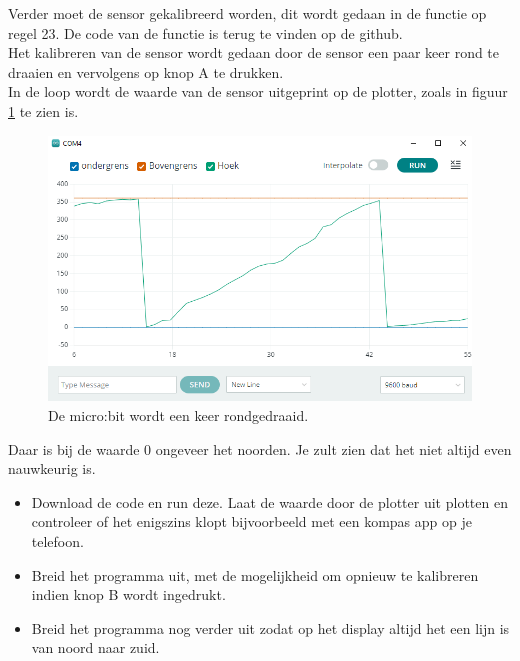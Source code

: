 \begin{enumerate}
Verder moet de sensor gekalibreerd worden, dit wordt gedaan in de functie op regel 23. De code van de functie is terug te vinden op de github.\\

Het kalibreren van de sensor wordt gedaan door de sensor een paar keer rond te draaien en vervolgens op knop A te drukken.\\

In de loop wordt de waarde van de sensor uitgeprint op de plotter, zoals in figuur \ref{fig:kompas_circle} te zien is.
\begin{figure}[h!]
	\captionsetup{justification=centering}
	\includegraphics[width=0.5 \linewidth]{figuren/kompas_circle}
	\centering
	\caption{De micro:bit wordt een keer rondgedraaid.}
	\label{fig:kompas_circle}
\end{figure}
Daar is bij de waarde 0 ongeveer het noorden. Je zult zien dat het niet altijd even nauwkeurig is.

\begin{itemize}
	\item Download de code en run deze. Laat de waarde door de plotter uit plotten en controleer of het enigszins klopt bijvoorbeeld met een kompas app op je telefoon.
	\item Breid het programma uit, met de mogelijkheid om opnieuw te kalibreren indien knop B wordt ingedrukt.
	\item Breid het programma nog verder uit zodat op het display altijd het een lijn is van noord naar zuid.
\end{itemize}

\end{enumerate}
	

	
	

